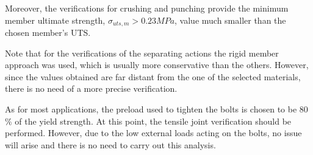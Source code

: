 Moreover, the verifications for crushing and punching provide the minimum member ultimate strength, $\sigma_{uts,m} > 0.23 MPa$, value much smaller than the chosen member's UTS.

Note that for the verifications of the separating actions the rigid member approach was used, which is usually more conservative than the others. However, since the values obtained are far distant from the one of the selected materials, there is no need of a more precise verification.

As for most applications, the preload used to tighten the bolts is chosen to be 80$\%$ of the yield strength. At this point, the tensile joint verification should be performed. However, due to the low external loads acting on the bolts, no issue will arise and there is no need to carry out this analysis. 